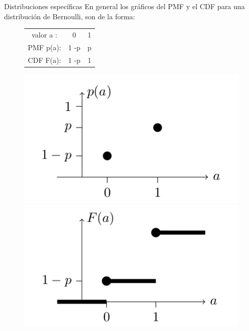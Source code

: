 \documentclass[10pt]{beamer}
\begin{document}
\begin{frame}{Distribuciones espec\'ificas}
En general los gr\'aficos del PMF y el CDF para una distribuci\'on de Bernoulli, son de la forma:

\begin{figure}
	\centering
	\begin{minipage}{.5\textwidth}
		\begin{table}[]
			\centering
			\begin{tabular}{ccc}
				valor  a  :    & 0    & 1    \\
				PMF   p(a): & 1 -p &  p     \\
				CDF   F(a):& 1 -p  &  1	
			\end{tabular}
		\end{table}
	\end{minipage}%
	\begin{minipage}{.3\textwidth}
		\centering
		\includegraphics[width=1.2\linewidth]{v11}
	\end{minipage}
	\begin{minipage}{.3\textwidth}
		\centering
		\includegraphics[width=1.2\linewidth]{v12}
	\end{minipage}
\end{figure}
\end{frame}
\end{document}
